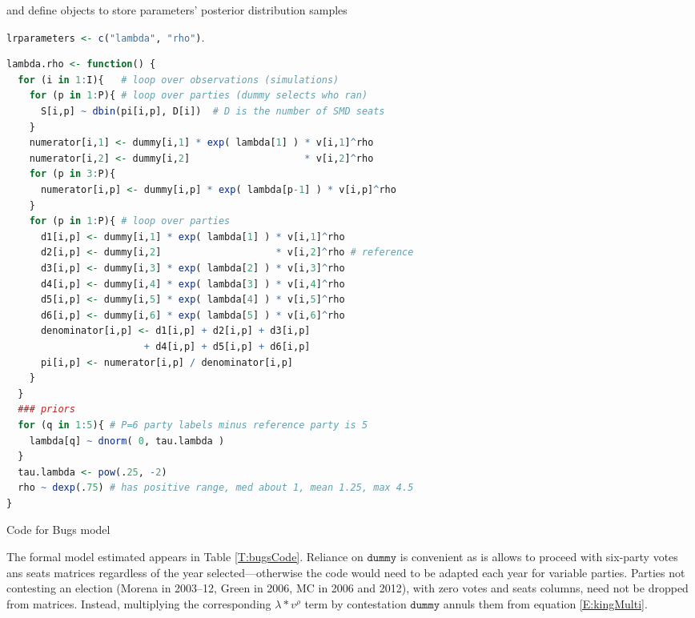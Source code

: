 \documentclass[letter,12pt]{article}
\begin{document}
\noindent and define objects to store  parameters' posterior distribution samples

\begin{center}
\lstinline[language=R]!lrparameters <- c("lambda", "rho")!.
\end{center}

\lstset{style=mystyle}
\begin{table}
\centering
{}
\begin{lstlisting}[language=R]
lambda.rho <- function() {
  for (i in 1:I){   # loop over observations (simulations)
    for (p in 1:P){ # loop over parties (dummy selects who ran)
      S[i,p] ~ dbin(pi[i,p], D[i])  # D is the number of SMD seats
    }
    numerator[i,1] <- dummy[i,1] * exp( lambda[1] ) * v[i,1]^rho
    numerator[i,2] <- dummy[i,2]                    * v[i,2]^rho
    for (p in 3:P){
      numerator[i,p] <- dummy[i,p] * exp( lambda[p-1] ) * v[i,p]^rho
    }
    for (p in 1:P){ # loop over parties
      d1[i,p] <- dummy[i,1] * exp( lambda[1] ) * v[i,1]^rho 
      d2[i,p] <- dummy[i,2]                    * v[i,2]^rho # reference
      d3[i,p] <- dummy[i,3] * exp( lambda[2] ) * v[i,3]^rho 
      d4[i,p] <- dummy[i,4] * exp( lambda[3] ) * v[i,4]^rho 
      d5[i,p] <- dummy[i,5] * exp( lambda[4] ) * v[i,5]^rho 
      d6[i,p] <- dummy[i,6] * exp( lambda[5] ) * v[i,6]^rho 
      denominator[i,p] <- d1[i,p] + d2[i,p] + d3[i,p] 
                        + d4[i,p] + d5[i,p] + d6[i,p]
      pi[i,p] <- numerator[i,p] / denominator[i,p]
    }
  }
  ### priors
  for (q in 1:5){ # P=6 party labels minus reference party is 5
    lambda[q] ~ dnorm( 0, tau.lambda )
  }
  tau.lambda <- pow(.25, -2)
  rho ~ dexp(.75) # has positive range, med about 1, mean 1.25, max 4.5
}
\end{lstlisting}
\caption{Code for Bugs model}\label{T:bugsCode}
\end{table}

The formal model estimated appears in Table \ref{T:bugsCode}. Reliance on $\texttt{dummy}$ is convenient as is allows to proceed with six-party votes ans seats matrices regardless of the year selected---otherwise the code would need to be adapted each year for variable parties. Parties not contesting an election (Morena in 2003--12, Green in 2006, MC in 2006 and 2012), with zero votes and seats columns, need not be dropped from matrices. Instead, multiplying the corresponding $\lambda * v^\rho$ term by contestation $\texttt{dummy}$ annuls them from equation \ref{E:kingMulti}. 
\end{document}
